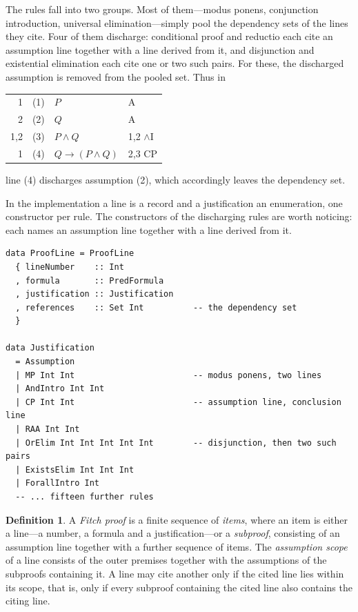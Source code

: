 \documentclass[11pt]{article}
\makeatletter
\theoremstyle{plain}
\theoremstyle{definition}
\newtheorem{definition}[theorem]{Definition}
\theoremstyle{remark}
\newcommand{\dep}[1]{\textup{#1}}
\newenvironment{lemmonproof}
  {\begin{center}\begin{tabular}{@{}r@{\hspace{1.5em}}r@{\hspace{0.6em}}l@{\hspace{2.5em}}l@{}}}
  {\end{tabular}\end{center}}
\makeatother
\begin{document}
The rules fall into two groups. Most of them---modus ponens, conjunction
introduction, universal elimination---simply pool the dependency sets of the
lines they cite. Four of them discharge: conditional proof and reductio each
cite an assumption line together with a line derived from it, and disjunction
and existential elimination each cite one or two such pairs. For these, the
discharged assumption is removed from the pooled set. Thus in

\begin{lemmonproof}
\dep{1}   & (1) & $P$              & A \\
\dep{2}   & (2) & $Q$              & A \\
\dep{1,2} & (3) & $P \wedge Q$     & 1,2 $\wedge$I \\
\dep{1}   & (4) & $Q \to (P \wedge Q)$ & 2,3 CP \\
\end{lemmonproof}

\noindent line (4) discharges assumption (2), which accordingly leaves the
dependency set.

In the implementation a line is a record and a justification an enumeration,
one constructor per rule. The constructors of the discharging rules are worth
noticing: each names an assumption line together with a line derived from it.

\begin{lstlisting}
data ProofLine = ProofLine
  { lineNumber    :: Int
  , formula       :: PredFormula
  , justification :: Justification
  , references    :: Set Int          -- the dependency set
  }

data Justification
  = Assumption
  | MP Int Int                        -- modus ponens, two lines
  | AndIntro Int Int
  | CP Int Int                        -- assumption line, conclusion line
  | RAA Int Int
  | OrElim Int Int Int Int Int        -- disjunction, then two such pairs
  | ExistsElim Int Int Int
  | ForallIntro Int
  -- ... fifteen further rules
\end{lstlisting}

\begin{definition}\label{def:fitch}
A \emph{Fitch proof} is a finite sequence of \emph{items}, where an item is
either a line---a number, a formula and a justification---or a
\emph{subproof}, consisting of an assumption line together with a further
sequence of items. The \emph{assumption scope} of a line consists of the outer
premises together with the assumptions of the subproofs containing it. A line
may cite another only if the cited line lies
within its scope, that is, only if every subproof containing the cited line
also contains the citing line.
\end{definition}
\end{document}
